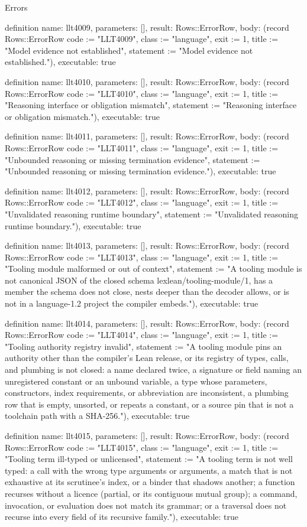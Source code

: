 \begin{lexlean}{Errors}
\begin{semanticmodule}
definition{
  name: llt4009,
  parameters: [],
  result: Rows::ErrorRow,
  body: (record Rows::ErrorRow {code := "LLT4009", class := "language", exit := 1, title := "Model evidence not established", statement := "Model evidence not established."}),
  executable: true
}

definition{
  name: llt4010,
  parameters: [],
  result: Rows::ErrorRow,
  body: (record Rows::ErrorRow {code := "LLT4010", class := "language", exit := 1, title := "Reasoning interface or obligation mismatch", statement := "Reasoning interface or obligation mismatch."}),
  executable: true
}

definition{
  name: llt4011,
  parameters: [],
  result: Rows::ErrorRow,
  body: (record Rows::ErrorRow {code := "LLT4011", class := "language", exit := 1, title := "Unbounded reasoning or missing termination evidence", statement := "Unbounded reasoning or missing termination evidence."}),
  executable: true
}

definition{
  name: llt4012,
  parameters: [],
  result: Rows::ErrorRow,
  body: (record Rows::ErrorRow {code := "LLT4012", class := "language", exit := 1, title := "Unvalidated reasoning runtime boundary", statement := "Unvalidated reasoning runtime boundary."}),
  executable: true
}

definition{
  name: llt4013,
  parameters: [],
  result: Rows::ErrorRow,
  body: (record Rows::ErrorRow {code := "LLT4013", class := "language", exit := 1, title := "Tooling module malformed or out of context", statement := "A tooling module is not canonical JSON of the closed schema lexlean/tooling-module/1, has a member the schema does not close, nests deeper than the decoder allows, or is not in a language-1.2 project the compiler embeds."}),
  executable: true
}

definition{
  name: llt4014,
  parameters: [],
  result: Rows::ErrorRow,
  body: (record Rows::ErrorRow {code := "LLT4014", class := "language", exit := 1, title := "Tooling authority registry invalid", statement := "A tooling module pins an authority other than the compiler's Lean release, or its registry of types, calls, and plumbing is not closed: a name declared twice, a signature or field naming an unregistered constant or an unbound variable, a type whose parameters, constructors, index requirements, or abbreviation are inconsistent, a plumbing row that is empty, unsorted, or repeats a constant, or a source pin that is not a toolchain path with a SHA-256."}),
  executable: true
}

definition{
  name: llt4015,
  parameters: [],
  result: Rows::ErrorRow,
  body: (record Rows::ErrorRow {code := "LLT4015", class := "language", exit := 1, title := "Tooling term ill-typed or unlicensed", statement := "A tooling term is not well typed: a call with the wrong type arguments or arguments, a match that is not exhaustive at its scrutinee's index, or a binder that shadows another; a function recurses without a licence (partial, or its contiguous mutual group); a command, invocation, or evaluation does not match its grammar; or a traversal does not recurse into every field of its recursive family."}),
  executable: true
}


\end{semanticmodule}
\end{lexlean}

